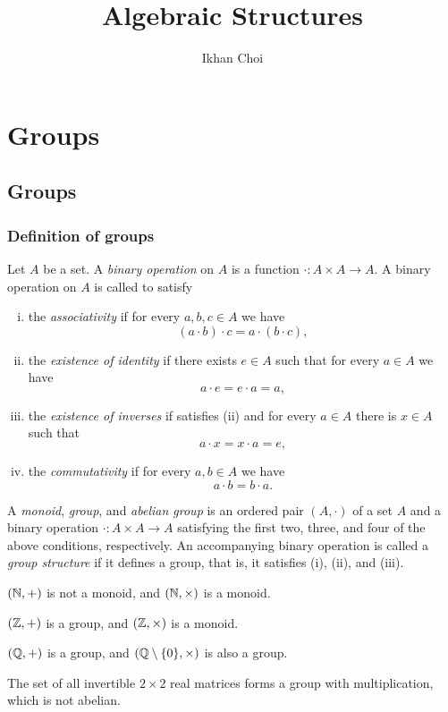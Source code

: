 \documentclass{../../large}
\begin{document}
\title{Algebraic Structures}
\author{Ikhan Choi}
\maketitle
\tableofcontents

\part{Groups}
\chapter{Groups}
\section{Definition of groups}

\begin{prb}
Let $A$ be a set.
A \emph{binary operation} on $A$ is a function $\cdot:A\times A\to A$.
A binary operation on $A$ is called to satisfy
\begin{enumerate}[(i)]
\item the \emph{associativity} if for every $a,b,c\in A$ we have
\[(a\cdot b)\cdot c=a\cdot(b\cdot c),\]
\item the \emph{existence of identity} if there exists $e\in A$ such that for every $a\in A$ we have
\[a\cdot e=e\cdot a=a,\]
\item the \emph{existence of inverses} if satisfies (ii) and for every $a\in A$ there is $x\in A$ such that
\[a\cdot x=x\cdot a=e,\]
\item the \emph{commutativity} if for every $a,b\in A$ we have
\[a\cdot b= b\cdot a.\]
\end{enumerate}
A \emph{monoid}, \emph{group}, and \emph{abelian group} is an ordered pair $(A,\cdot)$ of a set $A$ and a binary operation $\cdot:A\times A\to A$ satisfying the first two, three, and four of the above conditions, respectively.
An accompanying binary operation is called a \emph{group structure} if it defines a group, that is, it satisfies (i), (ii), and (iii).
\begin{parts}
\item $(\mathbb{N},+)$ is not a monoid, and $(\mathbb{N},\times)$ is a monoid.
\item $(\mathbb{Z},+)$ is a group, and $(\mathbb{Z},\times)$ is a monoid.
\item $(\mathbb{Q},+)$ is a group, and $(\mathbb{Q}\setminus\{0\},\times)$ is also a group.
\item The set of all invertible $2\times2$ real matrices forms a group with multiplication, which is not abelian.
\end{parts}
\end{prb}
\end{document}

